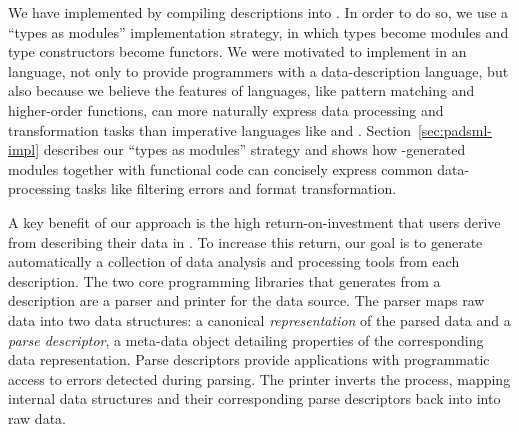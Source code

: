
We have implemented \padsml{} by compiling descriptions into
\ocaml{}.  In order to do so, we use a
``types as modules'' implementation strategy, in which \padsml{} types
become modules and \padsml{} type constructors become functors. 
We were motivated to implement \padsml{} in an \ml{} language, not
only to provide \ml{} programmers with a data-description language,
but also  because we believe the features of \ml{} languages, like pattern
matching and higher-order functions, can more naturally express data
processing and transformation tasks than imperative languages like
\C{} and \java{}.
Section~\ref{sec:padsml-impl} describes our ``types as modules''
strategy and shows how \padsml{}-generated modules together
with functional \ocaml{} code can concisely express
common
data-processing tasks like filtering errors and format transformation.



A key benefit of our approach is the high return-on-investment that
users derive from describing their data in \padsml{}.  To increase
this return, our goal is to generate automatically a collection of
data analysis and processing tools from each description.  The two core
programming libraries that \padsml{} generates from a description 
are a parser and printer for the data source.  The parser maps raw 
data into two data
structures: a canonical \textit{representation} of the parsed data and
a \textit{parse descriptor}, a meta-data object detailing properties
of the corresponding data representation.  Parse descriptors provide
applications with programmatic access to errors detected during
parsing.  The printer inverts the process, mapping internal data structures
and their corresponding parse descriptors back into into raw data.


